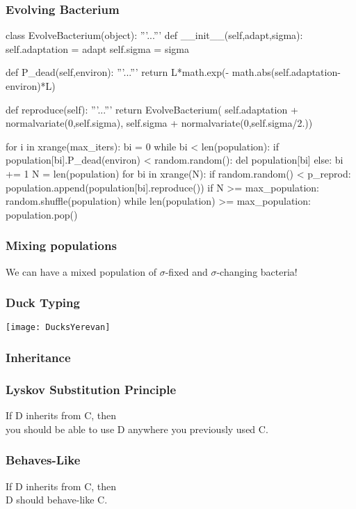 \begin{frame}[fragile]
\frametitle{Evolving Bacterium}

\begin{python}
class EvolveBacterium(object):
    '''...'''
    def __init__(self,adapt,sigma):
        self.adaptation = adapt
        self.sigma = sigma

    def P_dead(self,environ):
        '''...'''
        return L*math.exp(-
                math.abs(self.adaptation-environ)*L)
    
    def reproduce(self):
        '''...'''
        return EvolveBacterium(
            self.adaptation + normalvariate(0,self.sigma),
            self.sigma + normalvariate(0,self.sigma/2.))
\end{python}
\end{frame}

\begin{frame}[fragile]
\begin{python}
for i in xrange(max_iters):
    bi = 0
    while bi < len(population):
        if population[bi].P_dead(environ) < random.random():
            del population[bi]
        else:
            bi += 1
    N = len(population)
    for bi in xrange(N):
        if random.random() < p_reprod:
            population.append(population[bi].reproduce())
    if N >= max_population:
        random.shuffle(population)
        while len(population) >= max_population:
            population.pop()
\end{python}
\end{frame}

\begin{frame}[fragile]
\frametitle{Mixing populations}
We can have a mixed population of $\sigma$-fixed and $\sigma$-changing bacteria!
\end{frame}

\begin{frame}[fragile]
\frametitle{Duck Typing}

\centering
\texttt{[image: DucksYerevan]} %

\end{frame}

\begin{frame}[fragile]
\frametitle{Inheritance}

\end{frame}

\begin{frame}[fragile]
\frametitle{Lyskov Substitution Principle}

If D inherits from C, then\\
you should be able to use D anywhere you previously used C.

\end{frame}

\begin{frame}[fragile]
\frametitle{Behaves-Like}

If D inherits from C, then\\
D should behave-like C.

\end{frame}



